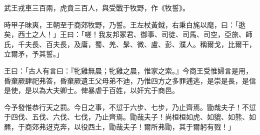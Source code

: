 
\begin{pinyinscope}
武王戎車三百兩，虎賁三百人，與受戰于牧野，作《牧誓》。

時甲子昧爽，王朝至于商郊牧野，乃誓。王左杖黃鉞，右秉白旄以麾，曰：「逖矣，西土之人！」王曰：「嗟！我友邦冢君、御事、司徒、司馬、司空，亞旅、師氏，千夫長、百夫長，及庸，蜀、羌、髳、微、盧、彭、濮人。稱爾戈，比爾干，立爾矛，予其誓。」

王曰：「古人有言曰：『牝雞無晨；牝雞之晨，惟家之索。』今商王受惟婦言是用，昏棄厥肆祀弗答，昏棄厥遺王父母弟不迪，乃惟四方之多罪逋逃，是崇是長，是信是使，是以為大夫卿士。俾暴虐于百姓，以奸宄于商邑。

今予發惟恭行天之罰。今日之事，不愆于六步、七步，乃止齊焉。勖哉夫子！不愆于四伐、五伐、六伐、七伐，乃止齊焉。勖哉夫子！尚桓桓如虎、如貔、如熊、如羆，于商郊弗迓克奔，以役西土，勖哉夫子！爾所弗勖，其于爾躬有戮！」


\end{pinyinscope}